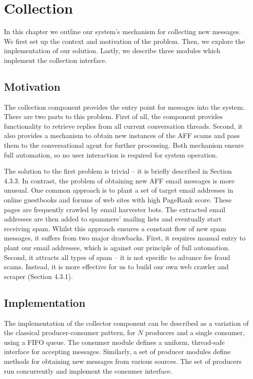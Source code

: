 \chapter{Collection}
In this chapter we outline our system's mechanism for collecting new messages. We first set up the context and motivation of the problem. Then, we explore the implementation of our solution. Lastly, we describe three modules which implement the collection interface.

\section{Motivation}
The collection component provides the entry point for messages into the system. There are two parts to this problem. First of all, the component provides functionality to retrieve replies from all current conversation threads. Second, it also provides a mechanism to obtain new instances of the AFF scams and pass them to the conversational agent for further processing. Both mechanism ensure full automation, so no user interaction is required for system operation.

The solution to the first problem is trivial -- it is briefly described in Section 4.3.3. In contrast, the problem of obtaining new AFF email messages is more unusual. One common approach is to plant a set of target email addresses in online guestbooks and forums of web sites with high PageRank score. These pages are frequently crawled by email harvester bots. The extracted email addresses are then added to spammers' mailing lists and eventually start receiving spam. Whilst this approach ensures a constant flow of new spam messages, it suffers from two major drawbacks. First, it requires manual entry to plant our email addresses, which is against our principle of full automation. Second, it attracts all types of spam -- it is not specific to advance fee fraud scams. Instead, it is more effective for us to build our own web crawler and scraper (Section 4.3.1).

\section{Implementation}
The implementation of the collector component can be described as a variation of the classical producer-consumer pattern, for $N$ producers and a single consumer, using a FIFO queue. The consumer module defines a uniform, thread-safe interface for accepting messages. Similarly, a set of producer modules define methods for obtaining new messages from various sources. The set of producers run concurrently and implement the consumer interface.

